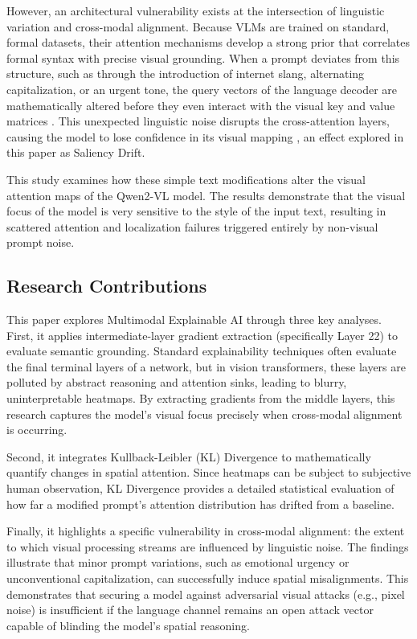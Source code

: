 \documentclass[11pt, letterpaper]{article}
\begin{document}
However, an architectural vulnerability exists at the intersection of linguistic variation and cross-modal alignment. Because VLMs are trained on standard, formal datasets, their attention mechanisms develop a strong prior that correlates formal syntax with precise visual grounding. When a prompt deviates from this structure, such as through the introduction of internet slang, alternating capitalization, or an urgent tone, the query vectors of the language decoder are mathematically altered before they even interact with the visual key and value matrices \citep{bousselham2026dexardynamicexplainabilitymethod, wang2024qwen2vlenhancingvisionlanguagemodels}. This unexpected linguistic noise disrupts the cross-attention layers, causing the model to lose confidence in its visual mapping \citep{bagdasaryan2023abusing, qi2023visualadversarialexamplesjailbreak}, an effect explored in this paper as Saliency Drift.

This study examines how these simple text modifications alter the visual attention maps of the Qwen2-VL model. The results demonstrate that the visual focus of the model is very sensitive to the style of the input text, resulting in scattered attention and localization failures triggered entirely by non-visual prompt noise.

\subsection{Research Contributions}
This paper explores Multimodal Explainable AI through three key analyses. First, it applies intermediate-layer gradient extraction (specifically Layer 22) to evaluate semantic grounding. Standard explainability techniques often evaluate the final terminal layers of a network, but in vision transformers, these layers are polluted by abstract reasoning and attention sinks, leading to blurry, uninterpretable heatmaps. By extracting gradients from the middle layers, this research captures the model's visual focus precisely when cross-modal alignment is occurring.

Second, it integrates Kullback-Leibler (KL) Divergence to mathematically quantify changes in spatial attention. Since heatmaps can be subject to subjective human observation, KL Divergence provides a detailed statistical evaluation of how far a modified prompt's attention distribution has drifted from a baseline.

Finally, it highlights a specific vulnerability in cross-modal alignment: the extent to which visual processing streams are influenced by linguistic noise. The findings illustrate that minor prompt variations, such as emotional urgency or unconventional capitalization, can successfully induce spatial misalignments. This demonstrates that securing a model against adversarial visual attacks (e.g., pixel noise) is insufficient if the language channel remains an open attack vector capable of blinding the model's spatial reasoning.
\end{document}
